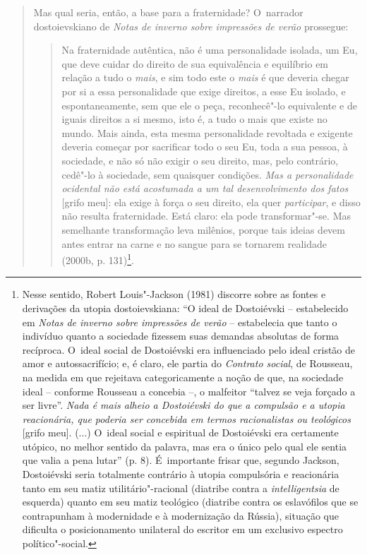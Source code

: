 {\begin{quote}
Mas qual seria, então, a base para a fraternidade? O~narrador
dostoievskiano de \emph{Notas de inverno sobre impressões de verão}
prossegue:

\begin{quote}
Na fraternidade autêntica, não é uma personalidade isolada, um Eu, que
deve cuidar do direito de sua equivalência e equilíbrio em relação a
tudo o \emph{mais}, e sim todo este o \emph{mais} é que deveria chegar
por si a essa personalidade que exige direitos, a esse Eu isolado, e
espontaneamente, sem que ele o peça, reconhecê"-lo equivalente e de
iguais direitos a si mesmo, isto é, a tudo o mais que existe no mundo.
Mais ainda, esta mesma personalidade revoltada e exigente deveria
começar por sacrificar todo o seu Eu, toda a sua pessoa, à sociedade, e
não só não exigir o seu direito, mas, pelo contrário, cedê"-lo à
sociedade, sem quaisquer condições. \emph{Mas a personalidade ocidental
não está acostumada a um tal desenvolvimento dos fatos} {[}grifo meu{]}:
ela exige à força o seu direito, ela quer \emph{participar}, e disso não
resulta fraternidade. Está claro: ela pode transformar"-se. Mas
semelhante transformação leva milênios, porque tais ideias devem antes
entrar na carne e no sangue para se tornarem realidade (2000b, p.
131)\footnote{Nesse sentido, Robert Louis"-Jackson (1981) discorre sobre
  as fontes e derivações da utopia dostoievskiana: ``O ideal de
  Dostoiévski -- estabelecido em \emph{Notas de inverno sobre impressões
  de verão} -- estabelecia que tanto o indivíduo quanto a sociedade
  fizessem suas demandas absolutas de forma recíproca. O~ideal social de
  Dostoiévski era influenciado pelo ideal cristão de amor e
  autossacrifício; e, é claro, ele partia do \emph{Contrato social}, de
  Rousseau, na medida em que rejeitava categoricamente a noção de que,
  na sociedade ideal -- conforme Rousseau a concebia --, o malfeitor
  ``talvez se veja forçado a ser livre''. \emph{Nada é mais alheio a
  Dostoiévski do que a compulsão e a utopia reacionária, que poderia ser
  concebida em termos racionalistas ou teológicos} {[}grifo meu{]}.
  (...) O~ideal social e espiritual de Dostoiévski era certamente
  utópico, no melhor sentido da palavra, mas era o único pelo qual ele
  sentia que valia a pena lutar'' (p. 8). É~importante frisar que,
  segundo Jackson, Dostoiévski seria totalmente contrário à utopia
  compulsória e reacionária tanto em seu matiz utilitário"-racional
  (diatribe contra a \emph{intelligentsia} de esquerda) quanto em seu
  matiz teológico (diatribe contra os eslavófilos que se contrapunham à
  modernidade e à modernização da Rússia), situação que dificulta o
  posicionamento unilateral do escritor em um exclusivo espectro
  político"-social.}.
\end{quote}


\end{quote}}
